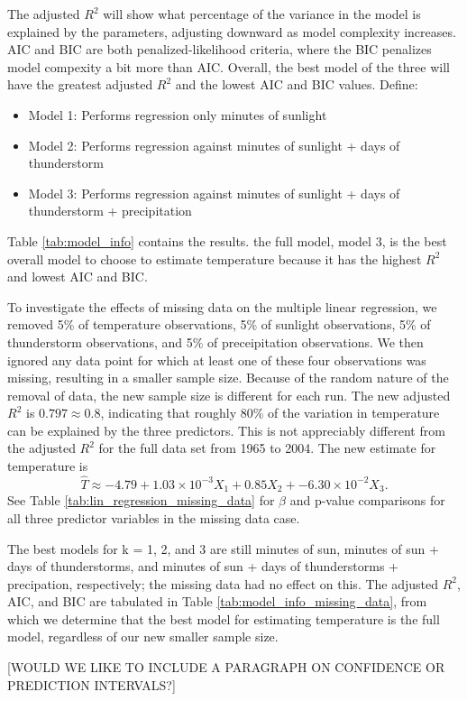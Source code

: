 The adjusted $R^{2}$ will show what percentage of the variance in the model is explained by the parameters, adjusting downward as model complexity increases. AIC and BIC are both penalized-likelihood criteria, where the BIC penalizes model compexity a bit more than AIC. Overall, the best model of the three will have the greatest adjusted $R^{2}$ and the lowest AIC and BIC values. Define: 

\begin{itemize}
	\item Model 1: Performs regression only minutes of sunlight
	\item Model 2: Performs regression against minutes of sunlight + days of thunderstorm
	\item Model 3: Performs regression against minutes of sunlight + days of thunderstorm + precipitation
\end{itemize} 

Table \ref{tab:model_info} contains the results. the full model, model 3, is the best overall model to choose to estimate temperature because it has the highest $R^{2}$ and lowest AIC and BIC.

To investigate the effects of missing data on the multiple linear regression, we removed 5\% of temperature observations, 5\% of sunlight observations, 5\% of thunderstorm observations, and 5\% of preceipitation observations. We then ignored any data point for which at least one of these four observations was missing, resulting in a smaller sample size. Because of the random nature of the removal of data, the new sample size is different for each run. The new adjusted $R^{2}$ is $0.797 \approx 0.8$, indicating that roughly 80\% of the variation in temperature can be explained by the three predictors. This is not appreciably different from the adjusted $R^{2}$ for the full data set from 1965 to 2004. The new estimate for temperature is $$\hat{T} \approx -4.79 + 1.03 \times 10^{-3}X_{1} + 0.85X_{2} + -6.30\times 10^{-2}X_{3}.$$ See Table \ref{tab:lin_regression_missing_data} for $\beta$ and p-value comparisons for all three predictor variables in the missing data case.

The best models for k = 1, 2, and 3 are still minutes of sun, minutes of sun + days of thunderstorms, and minutes of sun + days of thunderstorms + precipation, respectively; the missing data had no effect on this. The adjusted $R^{2}$, AIC, and BIC are tabulated in Table \ref{tab:model_info_missing_data}, from which we determine that the best model for estimating temperature is the full model, regardless of our new smaller sample size.

[WOULD WE LIKE TO INCLUDE A PARAGRAPH ON CONFIDENCE OR PREDICTION INTERVALS?]